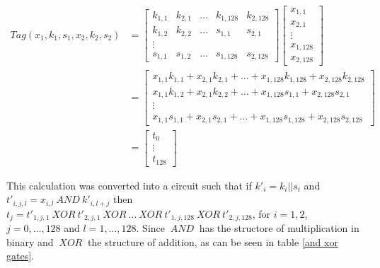 \documentclass[10pt,a4paper]{article}
\newcommand{\AND}{\ensuremath{~AND~}}
\newcommand{\XOR}{\ensuremath{~XOR~}}
\begin{document}
\begin{align*}
    Tag(x_1, k_1, s_1, x_2, k_2, s_2)
    &= 
    \begin{bmatrix}
        k_{1,1} & k_{2,1} & \dots & k_{1,128} & k_{2,128}    \\
        k_{1,2 }& k_{2,2} & \dots & s_{1,1}   & s_{2,1}      \\
        \vdots                                               \\
        s_{1,1} & s_{1,2} & \dots & s_{1,128} & s_{2,128}
    \end{bmatrix}
    \begin{bmatrix}
        x_{1,1}    \\
        x_{2,1}    \\
        \vdots     \\
        x_{1,128}  \\
        x_{2,128}
    \end{bmatrix}  \\
    &=
    \begin{bmatrix}
        x_{1,1}k_{1,1} + x_{2,1}k_{2,1} + \dots + x_{1,128}k_{1,128} + x_{2,128}k_{2,128}    \\
        x_{1,1}k_{1,2} + x_{2,1}k_{2,2} + \dots + x_{1,128}s_{1,1} + x_{2,128}s_{2,1}      \\
        \vdots \\
        x_{1,1}s_{1,1} + x_{2,1}s_{2,1} + \dots + x_{1,128}s_{1,128} + x_{2,128}s_{2,128}        
    \end{bmatrix}    \\
    &= 
    \begin{bmatrix}
        t_0    \\
        \vdots    \\
        t_{128}
    \end{bmatrix}
\end{align*}

This calculation was converted into a circuit such that if $k'_i= k_i||s_i$ and$t'_{i,j,l} = x_{i,l} \AND k'_{i,l+j}$ then $t_j = t'_{1,j,1} \XOR t'_{2,j,1} \XOR \dots \XOR t'_{1,j,128} \XOR t'_{2,j,128}$, for $i=1,2$, $j=0,\dots, 128$ and $l=1,\dots, 128$. Since $\AND$ has the structore of multiplication in binary and $\XOR$ the structure of addition, as can be seen in table \ref{and xor gates}.
\end{document}
